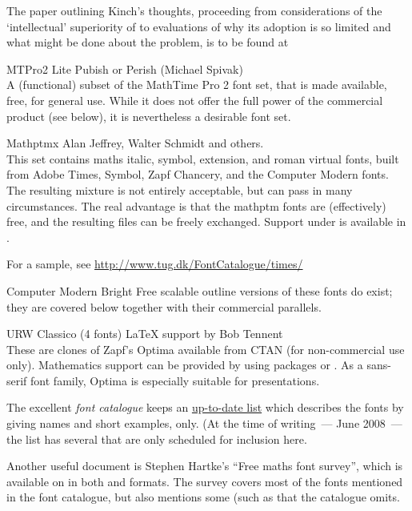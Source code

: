 \begin{booklist}
  The paper outlining Kinch's thoughts, proceeding from considerations
  of the `intellectual' superiority of \MF{} to evaluations of why its
  adoption is so limited and what might be done about the problem, is
  to be found at 

\item[MTPro2 Lite]Pubish or Perish (Michael Spivak)\\
  A (functional) subset of the MathTime Pro 2 font set, that is made
  available, free, for general use.  While it does not offer the full
  power of the commercial product (see below), it is nevertheless a
  desirable font set.

\item[Mathptmx]Alan Jeffrey, Walter Schmidt and others.\\
  This set contains maths italic, symbol, extension, and roman virtual
  fonts, built from Adobe Times, Symbol, Zapf Chancery, and the
  Computer Modern fonts.  The resulting mixture is not  entirely
  acceptable, but can pass in many circumstances.  The real advantage
  is that the mathptm fonts are (effectively) free, and the resulting
  \PS{} files can be freely exchanged.  Support under \LaTeXe{}
  is available in .

  For a sample, see \url{http://www.tug.dk/FontCatalogue/times/}

\item[Computer Modern Bright]Free scalable outline versions of these
  fonts do exist; they are covered below together with their
  commercial parallels.

\item[URW Classico](4 fonts)  LaTeX support by Bob Tennent\\
  These are clones of Zapf's Optima available from CTAN (for
  non-commercial use only).  Mathematics support can be provided by
  using packages  or . As a
  sans-serif font family, Optima is especially suitable for
  presentations.
\end{booklist}
The excellent \emph{font catalogue} keeps an %
\href{http://www.tug.dk/FontCatalogue/mathfonts.html}{up-to-date list}
which describes the fonts by giving names and short examples, only.
(At the time of writing~--- June 2008~--- the list has several that
are only scheduled for inclusion here.

Another useful document is Stephen Hartke's ``Free maths font
survey'', which is available on  in both  and
 formats.  The survey covers most of the fonts mentioned in
the font catalogue, but also mentions some (such as 
that the catalogue omits.

